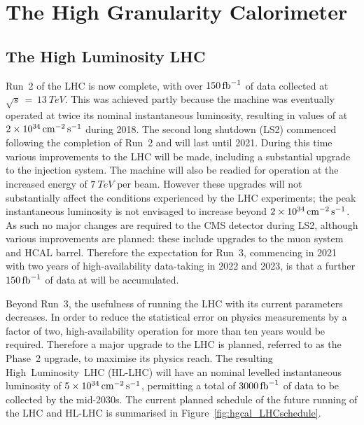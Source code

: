 \chapter{The High Granularity Calorimeter}
\label{chap:hgcal}

\section{The High Luminosity LHC}

Run~2 of the LHC is now complete, with over $\SI{150}{\ensuremath{\textrm{fb}^{-1}}}$ of data collected at $\sqrt{s}\,=\,\SI{13}{TeV}$. %
This was achieved partly because the machine was eventually operated at twice its nominal instantaneous luminosity, resulting in values of at $\SI{2e34}{\ensuremath{\textrm{cm}^{-2}\,\textrm{s}^{-1}}}$ during 2018.
The second long shutdown (LS2) commenced following the completion of Run~2 and will last until 2021.
During this time various improvements to the LHC will be made, including a substantial upgrade to the injection system.
The machine will also be readied for operation at the increased energy of $\SI{7}{TeV}$ per beam.
However these upgrades will not substantially affect the conditions experienced by the LHC experiments; 
the peak instantaneous luminosity is not envisaged to increase beyond $\SI{2e34}{\ensuremath{\textrm{cm}^{-2}\,\textrm{s}^{-1}}}$.
As such no major changes are required to the CMS detector during LS2, although various improvements are planned: 
these include upgrades to the muon system and HCAL barrel.
Therefore the expectation for Run~3, commencing in 2021 with two years of high-availability data-taking in 2022 and 2023, 
is that a further $\SI{150}{\ensuremath{\textrm{fb}^{-1}}}$ of data at will be accumulated. 

Beyond Run~3, the usefulness of running the LHC with its current parameters decreases.
In order to reduce the statistical error on physics measurements by a factor of two, high-availability operation for more than ten years would be required.
Therefore a major upgrade to the LHC is planned, referred to as the Phase~2 upgrade, to maximise its physics reach.
The resulting High~Luminosity~LHC (HL-LHC) \cite{HLLHC} will have an nominal levelled instantaneous luminosity of $\SI{5e34}{\ensuremath{\textrm{cm}^{-2}\,\textrm{s}^{-1}}}$, 
permitting a total of $\SI{3000}{\ensuremath{\textrm{fb}^{-1}}}$ of data to be collected by the mid-2030s.
The current planned schedule of the future running of the LHC and HL-LHC is summarised in Figure~\ref{fig:hgcal_LHCschedule}.

